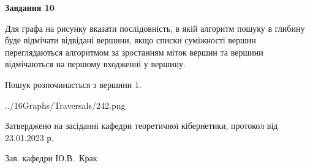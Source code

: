 \documentclass[12pt, ukrainian]{article}
\begin{document}
{\begin {large}
{\begin {center}\textbf{Завдання 10}\end {center}}\par
Для графа на рисунку вказати послідовність, в якій алгоритм пошуку в глибину буде відмічати відвідані вершини, якщо списки суміжності вершин переглядаються алгоритмом за зростанням міток вершин та вершини відмічаються на першому вход\-женні у вершину.\par
Пошук розпочинається з вершини 1.\par

\begin{center}
	{../16Graphs/Traversals/242.png}
\end{center}\par
\newpage


\end {large}
}
{\smallskip \begin {small} Затверджено на засіданні кафедри теоретичної кібернетики, протокол  від   23.01.2023 р.\par\smallskip\smallskip
{\parbox {6.5 cm}{Зав. кафедри \dotfill Ю.В.~Крак}} \end{small}}
\end{document}
